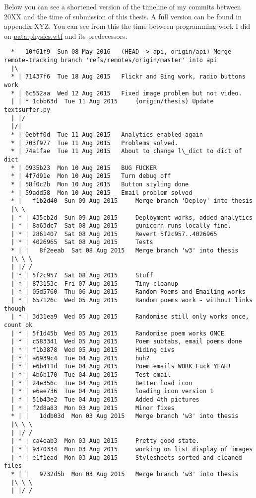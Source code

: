 Below you can see a shortened version of the timeline of my commits between 20XX and the time of submission of this thesis. A full version can be found in appendix XYZ. You can see from this the time between programming work I did on \url{pata.physics.wtf} and its predecessors.



\begin{verbatim}
  *   10f61f9  Sun 08 May 2016	 (HEAD -> api, origin/api) Merge remote-tracking branch 'refs/remotes/origin/master' into api
  |\  
  * | 71437f6  Tue 18 Aug 2015	 Flickr and Bing work, radio buttons work
  * | 6c552aa  Wed 12 Aug 2015	 Fixed image problem but not video.
  | | * 1cbb63d  Tue 11 Aug 2015	 (origin/thesis) Update textsurfer.py
  | |/  
  |/|   
  * | 0ebff0d  Tue 11 Aug 2015	 Analytics enabled again
  * | 703f977  Tue 11 Aug 2015	 Problems solved.
  * | 74a1fae  Tue 11 Aug 2015	 About to change l\_dict to dict of dict
  * | 0935b23  Mon 10 Aug 2015	 BUG FUCKER
  * | 4f7d91e  Mon 10 Aug 2015	 Turn debug off
  * | 58f0c2b  Mon 10 Aug 2015	 Button styling done
  * | 59add58  Mon 10 Aug 2015	 Email problem solved
  * |   f1b2d40  Sun 09 Aug 2015	 Merge branch 'Deploy' into thesis
  |\ \  
  | * | 435cb2d  Sun 09 Aug 2015	 Deployment works, added analytics
  | * | 8a63dc7  Sat 08 Aug 2015	 gunicorn runs locally fine.
  | * | 2861407  Sat 08 Aug 2015	 Revert 5f2c957..4026965
  | * | 4026965  Sat 08 Aug 2015	 Tests
  * | |   8f2eeab  Sat 08 Aug 2015	 Merge branch 'w3' into thesis
  |\ \ \  
  | |/ /  
  | * | 5f2c957  Sat 08 Aug 2015	 Stuff
  | * | 873153c  Fri 07 Aug 2015	 Tiny cleanup
  | * | 05d5760  Thu 06 Aug 2015	 Random Poems and Emailing works
  | * | 657126c  Wed 05 Aug 2015	 Random poems work - without links though
  | * | 3d31ea9  Wed 05 Aug 2015	 Randomise still only works once, count ok
  | * | 5f1d45b  Wed 05 Aug 2015	 Randomise poem works ONCE
  | * | c583341  Wed 05 Aug 2015	 Poem subtabs, email poems done
  | * | f1b3878  Wed 05 Aug 2015	 Hiding divs
  | * | a6939c4  Tue 04 Aug 2015	 huh?
  | * | e6b411d  Tue 04 Aug 2015	 Poem emails WORK Fuck YEAH!
  | * | 4b6b170  Tue 04 Aug 2015	 Test email
  | * | 24e356c  Tue 04 Aug 2015	 Better load icon
  | * | e6ae736  Tue 04 Aug 2015	 loading icon version 1
  | * | 51b43e2  Tue 04 Aug 2015	 Added 4th pictures
  | * | f2d8a83  Mon 03 Aug 2015	 Minor fixes
  * | |   1ddb03d  Mon 03 Aug 2015	 Merge branch 'w3' into thesis
  |\ \ \  
  | |/ /  
  | * | ca4eab3  Mon 03 Aug 2015	 Pretty good state.
  | * | 9370334  Mon 03 Aug 2015	 working on list display of images
  | * | e1f1ead  Mon 03 Aug 2015	 Stylesheets sorted and cleaned files
  * | |   9732d5b  Mon 03 Aug 2015	 Merge branch 'w3' into thesis
  |\ \ \  
  | |/ /  
\end{verbatim}

